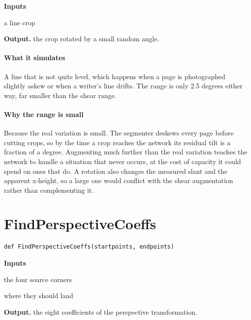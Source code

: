 \noindent\textbf{Inputs}
\begin{description}[leftmargin=2.2em,style=nextline,font=\normalfont\ttfamily]\setlength\itemsep{1pt}
  \item[{img}] \normalfont a line crop
\end{description}

\noindent\textbf{Output.} the crop rotated by a small random angle.


\paragraph{What it simulates}
A line that is not quite level, which happens when a page is photographed slightly askew or when a writer's line drifts. The range is only 2.5 degrees either way, far smaller than the shear range.


\paragraph{Why the range is small}
Because the real variation is small. The segmenter deskews every page before cutting crops, so by the time a crop reaches the network its residual tilt is a fraction of a degree. Augmenting much further than the real variation teaches the network to handle a situation that never occurs, at the cost of capacity it could spend on ones that do. A rotation also changes the measured slant and the apparent x-height, so a large one would conflict with the shear augmentation rather than complementing it.


\section{FindPerspectiveCoeffs}
\begin{lstlisting}[style=sig]
def FindPerspectiveCoeffs(startpoints, endpoints)
\end{lstlisting}

\noindent\textbf{Inputs}
\begin{description}[leftmargin=2.2em,style=nextline,font=\normalfont\ttfamily]\setlength\itemsep{1pt}
  \item[{startpoints}] \normalfont the four source corners
  \item[{endpoints}] \normalfont where they should land
\end{description}

\noindent\textbf{Output.} the eight coefficients of the perspective transformation.


